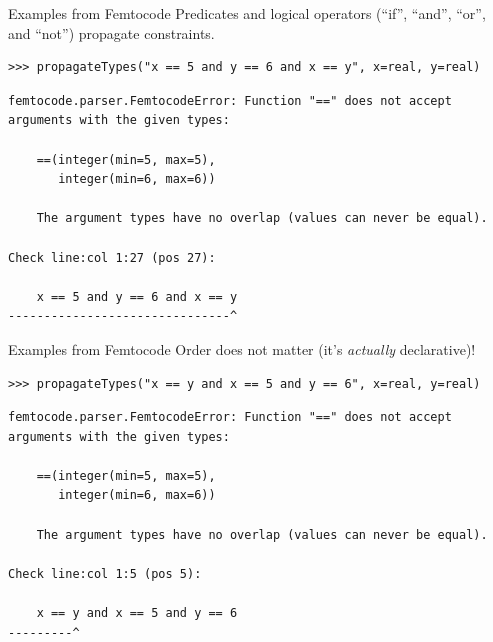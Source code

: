\documentclass[aspectratio=169]{beamer}
\begin{document}
\begin{frame}[fragile]{Examples from Femtocode}
\vspace{0.5 cm}
Predicates and logical operators (``if'', ``and'', ``or'', and ``not'') propagate constraints.

\small
\begin{verbatim}
>>> propagateTypes("x == 5 and y == 6 and x == y", x=real, y=real)
\end{verbatim}
{\color{red}
\begin{verbatim}
femtocode.parser.FemtocodeError: Function "==" does not accept
arguments with the given types:

    ==(integer(min=5, max=5),
       integer(min=6, max=6))

    The argument types have no overlap (values can never be equal).

Check line:col 1:27 (pos 27):

    x == 5 and y == 6 and x == y
-------------------------------^
\end{verbatim}}
\end{frame}

\begin{frame}[fragile]{Examples from Femtocode}
\vspace{0.5 cm}
Order does not matter (it's {\it actually} declarative)!

\small
\begin{verbatim}
>>> propagateTypes("x == y and x == 5 and y == 6", x=real, y=real)
\end{verbatim}
{\color{red}
\begin{verbatim}
femtocode.parser.FemtocodeError: Function "==" does not accept
arguments with the given types:

    ==(integer(min=5, max=5),
       integer(min=6, max=6))

    The argument types have no overlap (values can never be equal).

Check line:col 1:5 (pos 5):

    x == y and x == 5 and y == 6
---------^
\end{verbatim}}
\end{frame}
\end{document}
